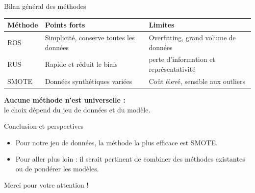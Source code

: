 \documentclass{beamer}
\begin{document}
\begin{frame}{Bilan général des méthodes}
    \centering
    \small
    \begin{tabular}{|l|p{3cm}|p{3cm}|}
        \hline
        \centering
        \textbf{Méthode} & \textbf{Points forts} & \textbf{Limites} \\
        \hline
        \centering
        ROS & Simplicité, conserve toutes les données & Overfitting, grand volume de données \\
        \hline
        \centering
        RUS & Rapide et réduit le biais & perte d'information et représentativité \\
        \hline
        \centering
        SMOTE & Données synthétiques variées & Coût élevé, sensible aux outliers \\
        \hline
    \end{tabular}
    \vspace{0.7cm}

    \textbf{Aucune méthode n’est universelle :}\\
    le choix dépend du jeu de données et du modèle.
\end{frame}

\begin{frame}{Conclusion et perspectives}
    \begin{itemize}
        \item Pour notre jeu de données, la méthode la plus efficace est SMOTE.\\[0.5cm]
        \item  Pour aller plus loin : il serait pertinent de combiner des méthodes existantes ou de pondérer les modèles.
    \end{itemize}
\end{frame}

\begin{frame}
    \centering
    \Huge Merci pour votre attention !
\end{frame}
\end{document}
